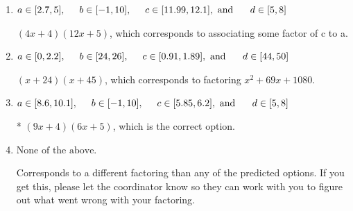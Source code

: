 \documentclass{extbook}[14pt]
\begin{document}
\begin{enumerate}
{\begin{enumerate}[label=\Alph*.]
 $(27x + 4)(2x + 5)$, which corresponds to associating some factor of a to c.
\item \( a \in [2.7, 5], \hspace*{5mm} b \in [-1, 10], \hspace*{5mm} c \in [11.99, 12.1], \text{ and } \hspace*{5mm} d \in [5, 8] \)

 $(4x + 4)(12x + 5)$, which corresponds to associating some factor of c to a.
\item \( a \in [0, 2.2], \hspace*{5mm} b \in [24, 26], \hspace*{5mm} c \in [0.91, 1.89], \text{ and } \hspace*{5mm} d \in [44, 50] \)

 $(x + 24)(x + 45)$, which corresponds to factoring $x^{2} +69 x + 1080$.
\item \( a \in [8.6, 10.1], \hspace*{5mm} b \in [-1, 10], \hspace*{5mm} c \in [5.85, 6.2], \text{ and } \hspace*{5mm} d \in [5, 8] \)

* $(9x + 4)(6x + 5)$, which is the correct option.
\item \( \text{None of the above.} \)

 Corresponds to a different factoring than any of the predicted options. If you get this, please let the coordinator know so they can work with you to figure out what went wrong with your factoring.
\end{enumerate}

}
\end{enumerate}
\end{document}

